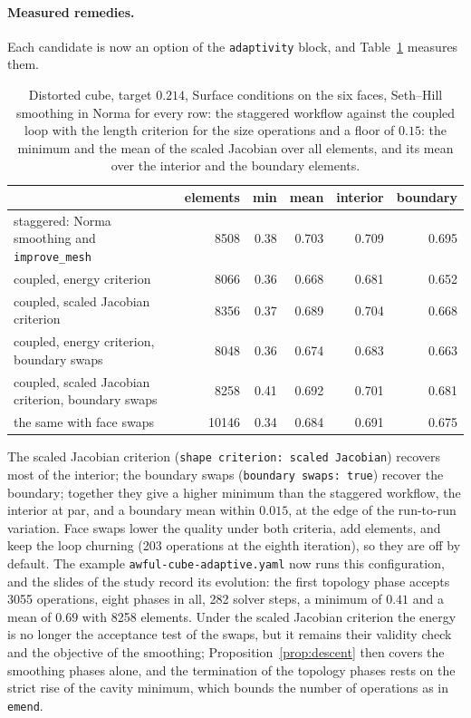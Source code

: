 \documentclass[11pt]{article}
\newcommand{\code}[1]{\texttt{#1}}
\begin{document}
\paragraph{Measured remedies.} Each candidate is now an option of the
\code{adaptivity} block, and Table~\ref{tab:staggered} measures them.
\begin{table}[htbp]
\centering
\small
\begin{tabular}{lrrrrr}
\toprule
& elements & min & mean & interior & boundary \\
\midrule
staggered: Norma smoothing and \code{improve\_mesh} & 8508 & 0.38 & 0.703 & 0.709 & 0.695 \\
coupled, energy criterion & 8066 & 0.36 & 0.668 & 0.681 & 0.652 \\
coupled, scaled Jacobian criterion & 8356 & 0.37 & 0.689 & 0.704 & 0.668 \\
coupled, energy criterion, boundary swaps & 8048 & 0.36 & 0.674 & 0.683 & 0.663 \\
coupled, scaled Jacobian criterion, boundary swaps & 8258 & 0.41 & 0.692 & 0.701 & 0.681 \\
the same with face swaps & 10146 & 0.34 & 0.684 & 0.691 & 0.675 \\
\bottomrule
\end{tabular}
\caption{Distorted cube, target $0.214$, Surface conditions on the six
faces, Seth--Hill smoothing in Norma for every row: the staggered
workflow against the coupled loop with the length criterion for the size
operations and a floor of $0.15$: the minimum and the mean of the scaled
Jacobian over all elements, and its mean over the interior and the
boundary elements.}
\label{tab:staggered}
\end{table}
The scaled Jacobian criterion (\code{shape criterion: scaled Jacobian})
recovers most of the interior; the boundary swaps
(\code{boundary swaps: true}) recover the boundary; together they give a
higher minimum than the staggered workflow, the interior at par, and a
boundary mean within $0.015$, at the edge of the run-to-run variation.
Face swaps lower the quality under both criteria, add elements, and keep
the loop churning (203 operations at the eighth iteration), so they are
off by default. The example \code{awful-cube-adaptive.yaml} now runs this
configuration, and the slides of the study record its evolution: the
first topology phase accepts 3055 operations, eight phases in all, 282
solver steps, a minimum of $0.41$ and a mean of $0.69$ with 8258
elements. Under the scaled Jacobian criterion the energy is no longer
the acceptance test of the swaps, but it remains their validity check and
the objective of the smoothing; Proposition~\ref{prop:descent} then
covers the smoothing phases alone, and the termination of the topology
phases rests on the strict rise of the cavity minimum, which bounds the
number of operations as in \code{emend}.
\end{document}

